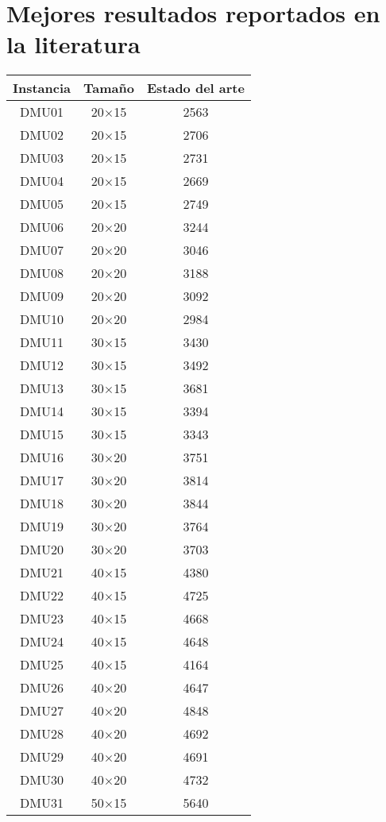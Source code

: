 \section{Mejores resultados reportados en la literatura}
\begin{table}[H]
\centering
\begin{tabular}{@{}ccc@{}}
\toprule
Instancia & Tamaño & Estado del arte \\ \midrule
DMU01 & 20$\times$15 & 2563\\ 
DMU02 & 20$\times$15 & 2706\\ 
DMU03 & 20$\times$15 & 2731\\ 
DMU04 & 20$\times$15 & 2669\\ 
DMU05 & 20$\times$15 & 2749\\ 
DMU06 & 20$\times$20 & 3244\\ 
DMU07 & 20$\times$20 & 3046\\ 
DMU08 & 20$\times$20 & 3188\\ 
DMU09 & 20$\times$20 & 3092\\ 
DMU10 & 20$\times$20 & 2984\\ 
DMU11 & 30$\times$15 & 3430\\ 
DMU12 & 30$\times$15 & 3492\\ 
DMU13 & 30$\times$15 & 3681\\ 
DMU14 & 30$\times$15 & 3394\\ 
DMU15 & 30$\times$15 & 3343\\ 
DMU16 & 30$\times$20 & 3751\\ 
DMU17 & 30$\times$20 & 3814\\ 
DMU18 & 30$\times$20 & 3844\\ 
DMU19 & 30$\times$20 & 3764\\ 
DMU20 & 30$\times$20 & 3703\\ 
DMU21 & 40$\times$15 & 4380\\ 
DMU22 & 40$\times$15 & 4725\\ 
DMU23 & 40$\times$15 & 4668\\ 
DMU24 & 40$\times$15 & 4648\\ 
DMU25 & 40$\times$15 & 4164\\ 
DMU26 & 40$\times$20 & 4647\\ 
DMU27 & 40$\times$20 & 4848\\ 
DMU28 & 40$\times$20 & 4692\\ 
DMU29 & 40$\times$20 & 4691\\ 
DMU30 & 40$\times$20 & 4732\\ 
DMU31 & 50$\times$15 & 5640\\ 

\end{tabular}
\end{table}
